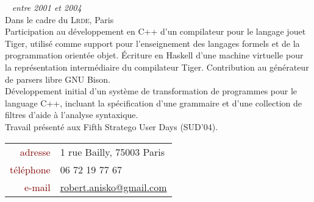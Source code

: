 \documentclass[a4paper, 10pt]{article}
\newcommand{\myurl}[1]{\fontspec{Gill Sans}\fontsize{10pt}{0pt}\selectfont #1}%
\begin{document}
\begin{minipage}[t]{0.59\linewidth}
    \par ~ \hfill \textcolor{medg}{\textit{entre 2001 et 2004}}\\[5pt]
    {\large Dans le cadre du \textsc{Lrde}, Paris}\\[5pt]
    Participation au d\'eveloppement en C++ d'un compilateur pour le langage jouet Tiger, utilis\'e comme support pour l'enseignement des langages formels et de la programmation orient\'ee objet. \'Ecriture en Haskell d'une machine virtuelle pour la repr\'esentation interm\'ediaire du compilateur Tiger. Contribution au g\'en\'erateur de parsers libre GNU Bison.\\[5pt]
    D\'eveloppement initial d'un syst\`eme de transformation de programmes pour le language C++, incluant la sp\'ecification d'une grammaire et d'une collection de filtres d'aide \`a l'analyse syntaxique.\\[5pt]
    Travail pr\'esent\'e aux Fifth Stratego User Days (SUD'04).\\


    \vspace{5em}

    {\large
    \begin{tabular}{@{}rl}
    \textcolor{maroon}{adresse} &
    1 rue Bailly, 75003 Paris\\
    \textcolor{maroon}{t\'el\'ephone} &
    06 72 19 77 67\\
    \textcolor{maroon}{e-mail} &
    {\myurl \url{robert.anisko@gmail.com}}\\
    \end{tabular}}
  \end{minipage}
  \hfill
\end{document}
